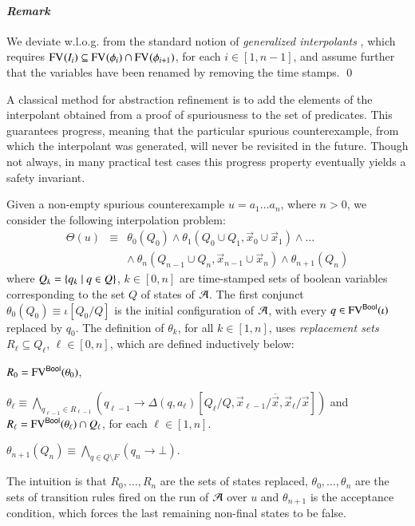\documentclass[10pt,conference,letterpaper,twocolumn]{IEEEtran}
\begin{document}
\paragraph{\em Remark} 
We deviate w.l.o.g. from the standard notion of \emph{generalized
  interpolants} \cite{mcmillan06}, which requires $\mathrm{FV}^{}(I_i)
\subseteq \mathrm{FV}^{}(\phi_i) \cap \mathrm{FV}^{}(\phi_{i+1})$, for each $i \in
          [1,n-1]$, and assume further that the variables have been
          renamed by removing the time stamps. \qed

A classical method for abstraction refinement is to add the elements
of the interpolant obtained from a proof of spuriousness to the set of
predicates. This guarantees progress, meaning that the particular
spurious counterexample, from which the interpolant was generated,
will never be revisited in the future. Though not always, in many
practical test cases this progress property eventually yields a safety
invariant.

Given a non-empty spurious counterexample $u = a_1\ldots a_n$, where
$n>0$, we consider the following interpolation problem: 
\begin{eqnarray}\label{eq:interpolation-problem}
\Theta(u) & \equiv & \theta_0(Q_0) \wedge \theta_1(Q_0 \cup Q_1,\vec{x}_0
\cup \vec{x}_1) \wedge \ldots \\ 
&& \wedge~ \theta_n(Q_{n-1} \cup Q_n,\vec{x}_{n-1} \cup \vec{x}_n) \wedge \theta_{n+1}(Q_n) \nonumber
\end{eqnarray}
where $Q_k = \left\{ q_k \mid q \in Q \right\}$, $k \in [0,n]$ are time-stamped
sets of boolean variables corresponding to the set $Q$ of states of
$\mathcal{A}$. The first conjunct $\theta_0(Q_0) \equiv \iota[Q_0/Q]$ is the
initial configuration of $\mathcal{A}$, with every $q \in \mathrm{FV}^{\mathsf{Bool}}(\iota)$
replaced by $q_0$. The definition of $\theta_k$, for all $k\in[1,n]$,
uses \emph{replacement sets} $R_\ell \subseteq Q_\ell$, $\ell\in
[0,n]$, which are defined inductively below: \begin{compactitem}
\item $R_0 = \mathrm{FV}^{\mathsf{Bool}}(\theta_0)$,
%
\item $\theta_\ell \equiv \bigwedge_{q_{\ell-1}\in R_{\ell-1}}
  (q_{\ell-1} \rightarrow
  \Delta(q,a_\ell)[Q_\ell/Q,\vec{x}_{\ell-1}/\overline{\vec{x}},\vec{x}_\ell/\vec{x}])$
  and $R_\ell = \mathrm{FV}^{\mathsf{Bool}}(\theta_\ell) \cap Q_\ell$, for each
  $\ell\in[1,n]$.
%
\item $\theta_{n+1}(Q_n) \equiv \bigwedge_{q \in Q \setminus F} (q_n
  \rightarrow \bot)$.
\end{compactitem}
The intuition is that $R_0,\ldots,R_n$ are the sets of states
replaced, $\theta_0, \ldots, \theta_n$ are the sets of transition
rules fired on the run of $\mathcal{A}$ over $u$ and $\theta_{n+1}$ is the
acceptance condition, which forces the last remaining non-final states
to be false.
\end{document}
